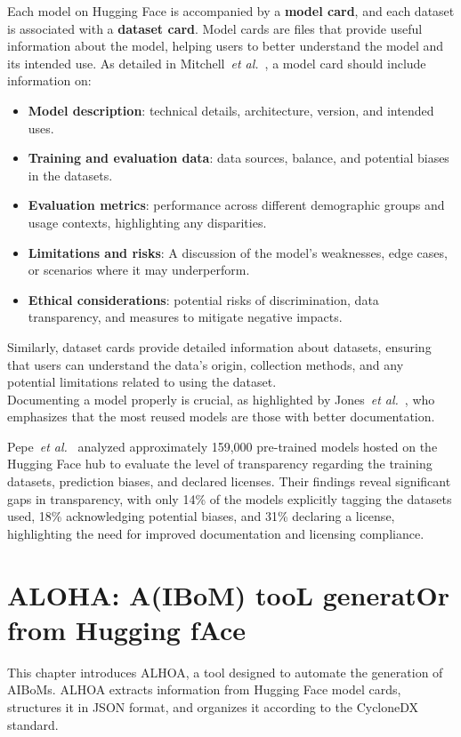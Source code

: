 \documentclass[12pt,a4paper, oneside, openright]{book}
\newcommand{\aiboms}{{AIBoMs}\xspace}
\newcommand{\etal}{\textit{et al.}\xspace}
\begin{document}
Each model on Hugging Face is accompanied by a \textbf{model card}, and each dataset is associated with a \textbf{dataset card}. Model cards are files that provide useful information about the model, helping users to better understand the model and its intended use. 
As detailed in Mitchell~\etal~\cite{Mitchell_2019}, a model card should include information on:
\begin{itemize}
    \item \textbf{Model description}: technical details, architecture, version, and intended uses.
    \item \textbf{Training and evaluation data}: data sources, balance, and potential biases in the datasets.
    \item \textbf{Evaluation metrics}: performance across different demographic groups and usage contexts, highlighting any disparities.
    \item \textbf{Limitations and risks}: A discussion of the model's weaknesses, edge cases, or scenarios where it may underperform.
    \item \textbf{Ethical considerations}: potential risks of discrimination, data transparency, and measures to mitigate negative impacts.
\end{itemize}
Similarly, dataset cards provide detailed information about datasets, ensuring that users can understand the data's origin, collection methods, and any potential limitations related to using the dataset.\\
Documenting a model properly is crucial, as highlighted by Jones~\etal~\cite{jones_What_do_we}, who emphasizes that the most reused models are those with better documentation.

 Pepe~\etal~\cite{How_do_Hugging} analyzed approximately 159,000 pre-trained models hosted on the Hugging Face hub to evaluate the level of transparency regarding the training datasets, prediction biases, and declared licenses. Their findings reveal significant gaps in transparency, with only 14\%
 of the models explicitly tagging the datasets used, 18\%
 acknowledging potential biases, and 31\%
 declaring a license, highlighting the need for improved documentation and licensing compliance. 


\chapter{ALOHA: A(IBoM) tooL generatOr from Hugging fAce}
This chapter introduces ALHOA, a tool designed to automate the generation of \aiboms. ALHOA extracts information from Hugging Face model cards, structures it in JSON format, and organizes it according to the CycloneDX standard.
\end{document}
